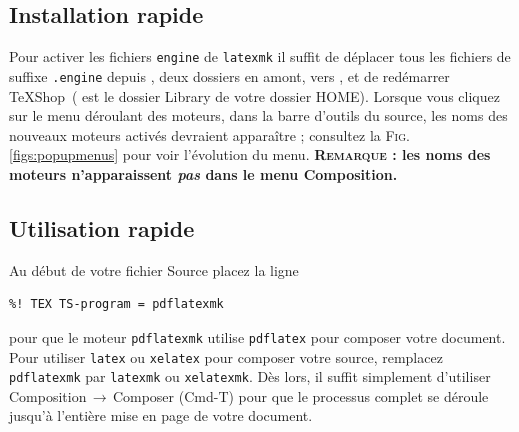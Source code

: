 \documentclass[11pt,french]{article}
\newcommand{\TS}{\textsf{\TeX Shop}}
\newcommand{\mnu}[1]{\textsf{#1}}
\newcommand{\cmd}[1]{\textsf{#1}}
\newcommand{\To}{\,\(\to\)\,}
\begin{document}
\subsection{Installation rapide}

Pour activer les fichiers \texttt{engine} de \texttt{latexmk} il suffit de déplacer tous les fichiers de suffixe \texttt{.engine}  depuis , deux dossiers en amont, vers , et de redémarrer \TS\ ( est le dossier \cmd{Library} de votre dossier \cmd{HOME}). Lorsque vous cliquez sur le menu déroulant des moteurs, dans la barre d'outils du source, les noms des nouveaux moteurs activés devraient apparaître ; consultez la \textsc{Fig.}\ref{figs:popupmenus} pour voir l'évolution du menu. \textbf{\textsc{Remarque} : les noms des moteurs n'apparaissent \emph{pas} dans le menu \mnu{Composition}.}
 
%

\subsection{Utilisation rapide}

Au début de votre fichier Source placez la ligne
\begin{verbatim}
%! TEX TS-program = pdflatexmk
\end{verbatim}
pour que le moteur \texttt{pdflatexmk} utilise \texttt{pdflatex} pour composer votre document. Pour utiliser \texttt{latex} ou \texttt{xelatex} pour composer votre source, remplacez \texttt{pdflatexmk} par \texttt{latexmk} ou \texttt{xelatexmk}. Dès lors, il suffit simplement d'utiliser \mnu{Composition}\To\mnu{Composer} (\cmd{Cmd-T}) pour que le processus complet se déroule jusqu'à l'entière mise en page de votre document. 
\end{document}
